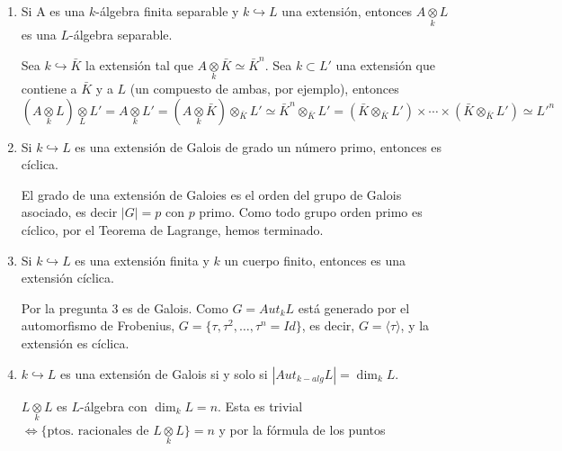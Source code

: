 \begin{enumerate}
\begin{dem}
        Se tiene pues el automorfismo de Frobenius $\tau: \bb F_{q^n}\longrightarrow \bb F_{q^n}$ que es de $\bb F_{q}$-\'algebras y se define como $\tau(b)=b^q$. $\tau^s = b^{q^s} = b$ siendo $s=n$ el primero que hace que suceda que $\tau^s=Id$. As\'i, $|\langle \tau\rangle| = n = |Aut_{\bb F_q-alg} \bb F_{q^n}|$, y por el teorema que caracteriza a las extensiones de Galois, parte b), hemos terminado.     \end{dem}
    \item Si A es una $k$-\'algebra finita separable y $k \hookrightarrow L$ una extensi\'on, entonces $A \underset{k}{\otimes} L$ es una $L$-\'algebra separable.
    \begin{dem}
        Sea $k \hookrightarrow \bar K$ la extensi\'on tal que $A \underset{k}{\otimes} \bar K \simeq \bar K^n$. Sea $k \subset L'$ una extensi\'on que contiene a $\bar K$ y a $L$ (un compuesto de ambas, por ejemplo), entonces
        $$(A\underset{k}{\otimes} L) \underset{L}{\otimes} L' = A\underset{k}{\otimes} L' = (A\underset{k}{\otimes} \bar K) \otimes_{\bar K} L' \simeq \bar K^n \otimes_{\bar K} L' = (\bar K \otimes_{\bar K} L') \times \cdots \times (\bar K \otimes_{\bar K} L')   \simeq L'^n$$
    \end{dem}
    \item Si $k \hookrightarrow L$ es una extensi\'on de Galois de grado un n\'umero primo, entonces es c\'iclica.
    \begin{dem}
        El grado de una extensi\'on de Galoies es el orden del grupo de Galois asociado, es decir $|G|=p$ con $p$ primo. Como todo grupo orden primo es c\'iclico, por el Teorema de Lagrange, hemos terminado. 
    \end{dem}
    \item Si $k \hookrightarrow L$ es una extensi\'on finita y $k$ un cuerpo finito, entonces es una extensi\'on c\'iclica.
    \begin{dem}
        Por la pregunta 3 es de Galois. Como $G = Aut_{k} L$ est\'a generado por el automorfismo de Frobenius, $G = \{\tau, \tau^2, \ldots, \tau^n = Id\}$, es decir, $G = \langle \tau\rangle$, y la extensi\'on es c\'iclica.
    \end{dem}
    \item $k \hookrightarrow L$ es una extensi\'on de Galois si y solo si $|Aut_{k-alg}L| = \dim_k L$.
    \begin{dem}
        $L\underset{k}{\otimes} L$ es $L$-\'algebra con $\dim_k L = n$. Esta es trivial $\iff \{\text{ptos. racionales de } L\underset{k}{\otimes} L \} = n $ y por la f\'ormula de los puntos

\end{dem}
\end{enumerate}
